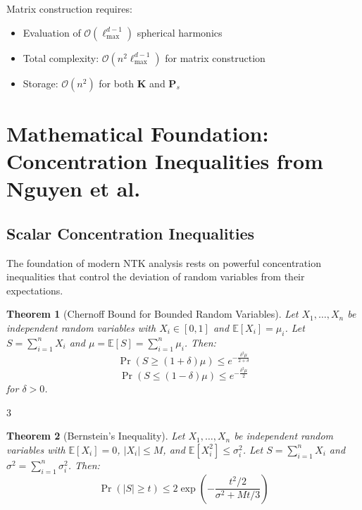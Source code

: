\documentclass[a4paper]{article}
\newcommand{\E}{\mathbb{E}}
\theoremstyle{plain}
\newtheorem{theorem}{Theorem}[section]
\theoremstyle{definition}
\theoremstyle{remark}
\begin{document}
\begin{tcolorbox}[colback=blue!10,colframe=blue!60!black,title=Remark: Computational Complexity]
Matrix construction requires:
\begin{itemize}
\item Evaluation of $\mathcal{O}(\ell_{\max}^{d-1})$ spherical harmonics
\item Total complexity: $\mathcal{O}(n^2 \ell_{\max}^{d-1})$ for matrix construction
\item Storage: $\mathcal{O}(n^2)$ for both $\mathbf{K}$ and $\mathbf{P}_s$
\end{itemize}
\end{tcolorbox}


\newpage



























\section{Mathematical Foundation: Concentration Inequalities from Nguyen et al.}

\subsection{Scalar Concentration Inequalities}

The foundation of modern NTK analysis rests on powerful concentration inequalities that control the deviation of random variables from their expectations.

\begin{theorem}[Chernoff Bound for Bounded Random Variables]
Let $X_1, \ldots, X_n$ be independent random variables with $X_i \in [0,1]$ and $\E[X_i] = \mu_i$. Let $S = \sum_{i=1}^n X_i$ and $\mu = \E[S] = \sum_{i=1}^n \mu_i$. Then:
$$\Pr(S \geq (1+\delta)\mu) \leq e^{-\frac{\delta^2 \mu}{2+\delta}}$$
$$\Pr(S \leq (1-\delta)\mu) \leq e^{-\frac{\delta^2 \mu}{2}}$$
for $\delta > 0$.
\end{theorem}

3\begin{theorem}[Bernstein's Inequality]
Let $X_1, \ldots, X_n$ be independent random variables with $\E[X_i] = 0$, $|X_i| \leq M$, and $\E[X_i^2] \leq \sigma_i^2$. Let $S = \sum_{i=1}^n X_i$ and $\sigma^2 = \sum_{i=1}^n \sigma_i^2$. Then:
$$\Pr(|S| \geq t) \leq 2\exp\left(-\frac{t^2/2}{\sigma^2 + Mt/3}\right)$$
\end{theorem}
\end{document}
